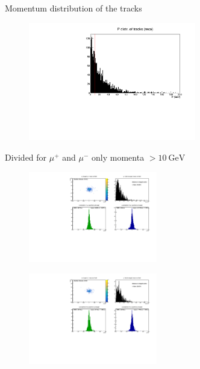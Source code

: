 \begin{frame}[t]{Momentum distribution of the tracks}
  \begin{figure}
    \centering
    \includegraphics[width=0.65\textwidth]{../hists/nofield/mom_reco_tracks.pdf}
  \end{figure}
\end{frame}

\begin{frame}[t]{Divided for $\mu^+$ and $\mu^-$ only momenta $> \SI{10}{\giga\electronvolt}$}
  \begin{multicols}{2}
    \begin{figure}
      \centering
      \includegraphics[width=0.5\textwidth]{../hists/nofield/P/target_dist_amu.pdf}
    \end{figure}
    \columnbreak
    \begin{figure}
      \centering
      \includegraphics[width=0.5\textwidth]{../hists/nofield/P/target_dist_mu.pdf}
    \end{figure}
  \end{multicols}
\end{frame}

